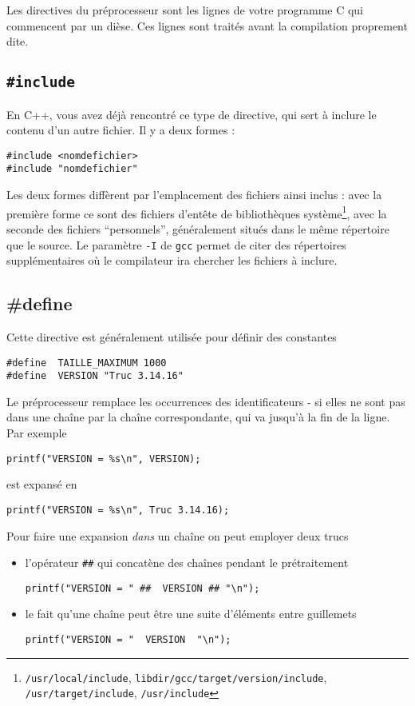 \documentclass[10pt]{article}
\begin{document}
Les directives du préprocesseur sont les lignes de votre programme C qui commencent par un dièse.
Ces lignes sont traités avant la compilation proprement dite.



\subsection{\texttt{\#include}}

En C++, vous avez déjà rencontré ce type de directive, qui sert à
inclure le contenu d'un autre fichier.  Il y a deux formes :
\begin{lstlisting}
#include <nomdefichier>
#include "nomdefichier"
\end{lstlisting}
Les deux formes diffèrent par l'emplacement des fichiers ainsi inclus
: avec la première forme ce sont des fichiers d'entête de bibliothèques
système\footnote{\texttt{/usr/local/include},
  \texttt{libdir/gcc/target/version/include},
  \texttt{/usr/target/include},
  \texttt{/usr/include}}, avec la seconde des fichiers ``personnels'', généralement situés dans
le même répertoire que le source.
Le paramètre \texttt{-I} de \texttt{gcc} permet de citer des répertoires supplémentaires où le compilateur
ira chercher les fichiers à inclure.


\subsection{{\#define}}

Cette directive est généralement utilisée pour définir des constantes
\begin{lstlisting}
#define  TAILLE_MAXIMUM 1000
#define  VERSION "Truc 3.14.16"
\end{lstlisting}
Le préprocesseur remplace les occurrences des identificateurs - si elles ne sont pas dans une chaîne par la chaîne correspondante,
qui va jusqu'à la fin de la ligne. Par exemple
\begin{lstlisting}
printf("VERSION = %s\n", VERSION);
\end{lstlisting}
est expansé en  
\begin{lstlisting}
printf("VERSION = %s\n", Truc 3.14.16);
\end{lstlisting}
Pour faire une expansion \emph{dans} un chaîne on peut employer deux trucs
\begin{itemize}
\item l'opérateur \texttt{\#\#} qui concatène des chaînes pendant le prétraitement
\begin{lstlisting}
printf("VERSION = " ##  VERSION ## "\n");
\end{lstlisting}
\item le fait qu'une chaîne peut être une suite d'éléments entre guillemets
\begin{lstlisting}
printf("VERSION = "  VERSION  "\n");
\end{lstlisting}
\end{itemize}
\end{document}
